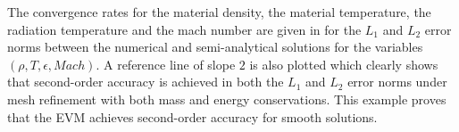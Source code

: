 \documentclass[times,doublespace]{fldauth}%
\begin{document}
%
The convergence rates for the material density, the material temperature, the radiation temperature and the mach number are given in  for the $L_1$ and $L_2$ error norms between the numerical and semi-analytical solutions for the variables $(\rho, T, \epsilon, Mach)$. A reference line of slope $2$ is also plotted which clearly shows that second-order accuracy is achieved in both the $L_1$ and $L_2$ error norms under mesh refinement with both mass and energy conservations. This example proves that the EVM achieves second-order accuracy for smooth solutions.
%
\end{document}
